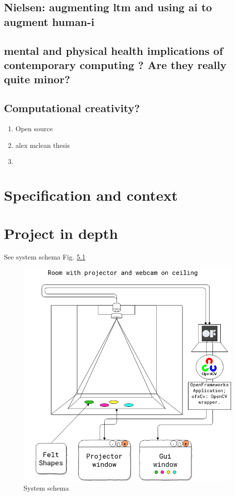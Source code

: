 \documentclass[12pt]{report}
\begin{document}
\section{Nielsen: augmenting ltm and using ai to augment human-i}
\label{sec:org5ea291f}

\section{mental and physical health implications of contemporary computing ? Are they really quite minor?}
\label{sec:orgf89ecc9}

\section{Computational creativity?}
\label{sec:orgc81e7e7}

\begin{enumerate}
\item Open source
\label{sec:org87da904}

\item alex mclean thesis
\label{sec:orgb3a7f7d}

\item 
\label{sec:org2243d13}
\end{enumerate}

\chapter{Specification and context}
\label{sec:org62455f8}
\chapter{Project in depth}
\label{sec:orgf8dcba2}

See system schema Fig.  \ref{system-schema}

\begin{figure}[htbp]
\centering
\includegraphics[width=.9\linewidth]{assets/project-schema-final.png}
\caption{System schema \label{system-schema}}
\end{figure}
\end{document}
